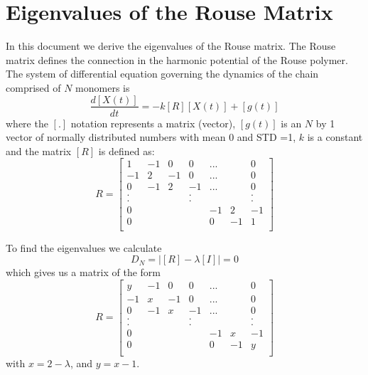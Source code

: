 \documentclass[12pt]{report}
\begin{document}
\section{Eigenvalues of the Rouse Matrix}\label{eigenvaluesOfTheRouseMatrix}
In this document we derive the eigenvalues of the Rouse matrix. The Rouse matrix defines the connection in the harmonic potential of the Rouse polymer. The system of differential equation governing the dynamics of the chain comprised of $N$ monomers is 
\begin{equation}
\frac{d[X(t)]}{dt}=-k[R][X(t)]+[g(t)]
\end{equation}
where the $[.]$ notation represents a matrix (vector), $[g(t)]$ is an $N$ by 1 vector of normally distributed numbers with mean 0 and STD =1, $k$ is a constant and the matrix $[R]$ is defined as:
\begin{equation}
R=\left[
\begin{matrix}
 1 & -1 &  0 &  0 &...&  &  0 \\
-1 &  2 & -1 &  0 &...&  &  0 \\
 0 & -1 &  2 & -1 &...&  &  0 \\
 . &    &    &  . &   &  &  . \\
 . &    &    &  . &   &  &  . \\
 0 &    &    &    & -1& 2& -1 \\
 0 &    &    &    &  0&-1&  1 \\     
\end{matrix}
\right]
\end{equation}

To find the eigenvalues we calculate 
\begin{equation*}
D_N=\left|[R]-\lambda[I]\right|=0
\end{equation*}
which gives us a matrix of the form 
\begin{equation*}
R=\left[
\begin{matrix}
 y & -1 &  0 &  0 &...&  &  0 \\
-1 &  x & -1 &  0 &...&  &  0 \\
 0 & -1 &  x & -1 &...&  &  0 \\
 . &    &    &  . &   &  &  . \\
 . &    &    &  . &   &  &  . \\
 0 &    &    &    & -1& x& -1 \\
 0 &    &    &    &  0&-1&  y \\     
\end{matrix}
\right]
\end{equation*}
with $x=2-\lambda$, and $y=x-1$.
\end{document}
